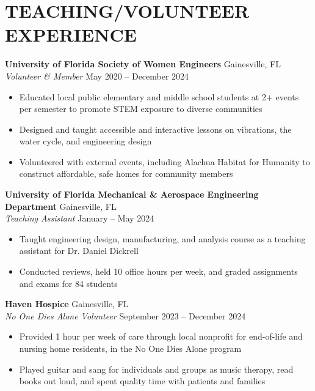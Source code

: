 \documentclass[10pt]{article}
\begin{document}
\section*{TEACHING/VOLUNTEER EXPERIENCE}
\textbf{University of Florida Society of Women Engineers} \hfill Gainesville, FL\\
\textit{Volunteer \& Member} \hfill May 2020 -- December 2024
\begin{itemize}[left=0em, itemsep=0.3em] %
    \footnotesize
    \fontsize{10pt}{11pt}\selectfont 
    \item Educated local public elementary and middle school students at 2+ events per semester to promote STEM exposure to diverse communities 
    \item Designed and taught accessible and interactive lessons on vibrations, the water cycle, and engineering design
    \item Volunteered with external events, including Alachua Habitat for Humanity to construct affordable, safe homes for community members
\end{itemize}

\textbf{University of Florida Mechanical \& Aerospace Engineering Department} \hfill Gainesville, FL\\
\textit{Teaching Assistant} \hfill January -- May 2024
\begin{itemize}[left=0em, itemsep=0.3em] %
    \footnotesize
    \fontsize{10pt}{11pt}\selectfont 
    \item Taught engineering design, manufacturing, and analysis course as a teaching assistant for Dr. Daniel Dickrell
 
    \item Conducted reviews, held 10 office hours per week, and graded assignments and exams for 84 students 
\end{itemize}
\textbf{Haven Hospice} \hfill Gainesville, FL\\
\textit{No One Dies Alone Volunteer} \hfill September 2023 -- December 2024
\begin{itemize}[left=0em, itemsep=0.3em] %
    \footnotesize
    \fontsize{10pt}{11pt}\selectfont 
    \item Provided 1 hour per week of care through local nonprofit for end-of-life and nursing home residents, in the No One Dies Alone program
    \item Played guitar and sang for individuals and groups as music therapy, read books out loud, and spent quality time with patients and families
\end{itemize}
\end{document}
